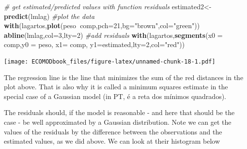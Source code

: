 \documentclass[
]{book}
\newenvironment{Shaded}{\begin{snugshade}}{\end{snugshade}}
\newcommand{\CommentTok}[1]{\textcolor[rgb]{0.56,0.35,0.01}{\textit{#1}}}
\newcommand{\DataTypeTok}[1]{\textcolor[rgb]{0.13,0.29,0.53}{#1}}
\newcommand{\DecValTok}[1]{\textcolor[rgb]{0.00,0.00,0.81}{#1}}
\newcommand{\FloatTok}[1]{\textcolor[rgb]{0.00,0.00,0.81}{#1}}
\newcommand{\KeywordTok}[1]{\textcolor[rgb]{0.13,0.29,0.53}{\textbf{#1}}}
\newcommand{\NormalTok}[1]{#1}
\newcommand{\OperatorTok}[1]{\textcolor[rgb]{0.81,0.36,0.00}{\textbf{#1}}}
\newcommand{\OtherTok}[1]{\textcolor[rgb]{0.56,0.35,0.01}{#1}}
\newcommand{\StringTok}[1]{\textcolor[rgb]{0.31,0.60,0.02}{#1}}
\begin{document}
\begin{Shaded}
\begin{Highlighting}[]
\CommentTok{# get estimated/predicted values with function residuals}
\NormalTok{estimated2<-}\KeywordTok{predict}\NormalTok{(lmlag)}
\CommentTok{#plot the data}
\KeywordTok{with}\NormalTok{(lagartos,}\KeywordTok{plot}\NormalTok{(peso}\OperatorTok{~}\NormalTok{comp,}\DataTypeTok{pch=}\DecValTok{21}\NormalTok{,}\DataTypeTok{bg=}\StringTok{"brown"}\NormalTok{,}\DataTypeTok{col=}\StringTok{"green"}\NormalTok{))}
\KeywordTok{abline}\NormalTok{(lmlag,}\DataTypeTok{col=}\DecValTok{3}\NormalTok{,}\DataTypeTok{lty=}\DecValTok{2}\NormalTok{)}
\CommentTok{#add residuals}
\KeywordTok{with}\NormalTok{(lagartos,}\KeywordTok{segments}\NormalTok{(}\DataTypeTok{x0 =}\NormalTok{ comp,}\DataTypeTok{y0 =}\NormalTok{ peso, }\DataTypeTok{x1=}\NormalTok{ comp, }\DataTypeTok{y1=}\NormalTok{estimated,}\DataTypeTok{lty=}\DecValTok{2}\NormalTok{,}\DataTypeTok{col=}\StringTok{"red"}\NormalTok{))}
\end{Highlighting}
\end{Shaded}

\texttt{[image: ECOMODbook\_files/figure-latex/unnamed-chunk-18-1.pdf]}

The regression line is the line that minimizes the sum of the red distances in the plot above. That is also why it is called a minimum squares estimate in the special case of a Gaussian model (in PT, é a reta dos mínimos quadrados).

The residuals should, if the model is reasonable - and here that should be the case - be well approximated by a Gaussian distribution. Note we can get the values of the residuals by the difference between the observations and the estimated values, as we did above. We can look at their histogram below

\begin{Shaded}
\end{Shaded}
\end{document}
